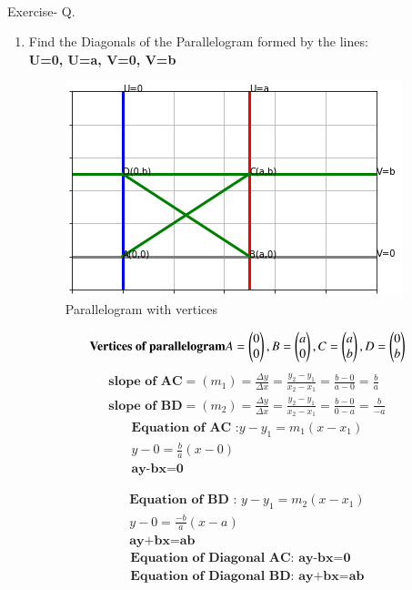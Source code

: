 \documentclass[journal,12pt,twocolumn]{IEEEtran}
\begin{document}
\maketitle
\renewcommand{\thefigure}{\theenumi}
\renewcommand{\thetable}{\theenumi}
\\
{Exercise- Q.}\\
\renewcommand{\theequation}{\theenumi}
\begin{enumerate}
\item Find the Diagonals of the Parallelogram formed by the lines:\\ 
\textbf{U=0, U=a, V=0, V=b}\\
\solution
\begin{figure}[!ht]
	\centering
	\includegraphics[width=\columnwidth]{Parallelogram.png}
	\caption{Parallelogram with vertices}
\end{figure}
\begin{equation}
\centering{\textbf{Vertices of parallelogram}}
\centering{A=\myvec{0\\0}, B=\myvec{a\\0}, C=\myvec{a\\b}, D=\myvec{0\\b}}
\end{equation}
\begin{align}
\textbf{slope of AC} = (m_1) = \frac{\Delta y}{\Delta x} = \frac{y_2 - y_1}{x_2 - x_1} = \frac{b-0}{a-0} =\frac{b}{a}\\
\textbf{slope of BD} = (m_2) = \frac{\Delta y}{\Delta x} = \frac{y_2 - y_1}{x_2 - x_1} = \frac{b-0}{0-a} = \frac{b}{-a}
\end{align}
\begin{align}
\textbf{Equation of AC :}
{y-y_1 = m_1 (x-x_1)}\\
{y-0 = \frac{b}{a} (x-0)}\\
{\textbf{ay-bx=0 }}
\end{align}


\begin{align}
\textbf{Equation of BD :  \[y-y_1 = m_2 (x-x_1)\]}\\
y-0 = \frac{-b}{a}(x-a)\\
\textbf{ay+bx=ab}
\end{align}
\begin{align}
\textbf{Equation of Diagonal AC: ay-bx=0}\\
\textbf{Equation of Diagonal BD: ay+bx=ab}
\end{align}
\end{enumerate}
\end{document}
